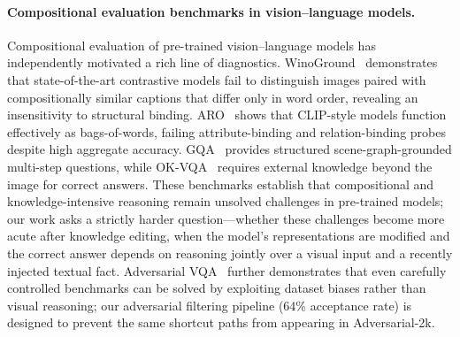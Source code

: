 \documentclass{article}
\begin{document}
\paragraph{Compositional evaluation benchmarks in vision--language models.}
Compositional evaluation of pre-trained vision--language models has independently motivated a rich line of diagnostics. WinoGround~\cite{winoground22} demonstrates that state-of-the-art contrastive models fail to distinguish images paired with compositionally similar captions that differ only in word order, revealing an insensitivity to structural binding. ARO~\cite{aro23} shows that CLIP-style models function effectively as bags-of-words, failing attribute-binding and relation-binding probes despite high aggregate accuracy. GQA~\cite{gqa19} provides structured scene-graph-grounded multi-step questions, while OK-VQA~\cite{okvqa19} requires external knowledge beyond the image for correct answers. These benchmarks establish that compositional and knowledge-intensive reasoning remain unsolved challenges in pre-trained models; our work asks a strictly harder question---whether these challenges become more acute after knowledge editing, when the model's representations are modified and the correct answer depends on reasoning jointly over a visual input and a recently injected textual fact. Adversarial VQA~\cite{li2019vqa} further demonstrates that even carefully controlled benchmarks can be solved by exploiting dataset biases rather than visual reasoning; our adversarial filtering pipeline (64\% acceptance rate) is designed to prevent the same shortcut paths from appearing in Adversarial-2k.
\end{document}
